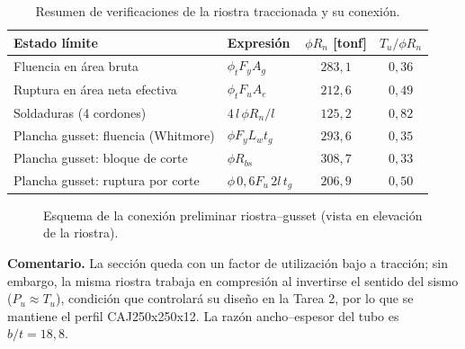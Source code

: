 \documentclass[11pt,letterpaper]{article}
\begin{document}
\begin{table}[H]
\centering
\caption{Resumen de verificaciones de la riostra traccionada y su conexión.}
\begin{tabular}{llcc}
\toprule
Estado límite & Expresión & $\phi R_n$ [tonf] & $T_u/\phi R_n$ \\
\midrule
Fluencia en área bruta & $\phi_t F_y A_g$ & $283{,}1$ & $0{,}36$ \\
Ruptura en área neta efectiva & $\phi_t F_u A_e$ & $212{,}6$ & $0{,}49$ \\
Soldaduras (4 cordones) & $4\,l\,\phi R_n/l$ & $125{,}2$ & $0{,}82$ \\
Plancha gusset: fluencia (Whitmore) & $\phi F_y L_w t_g$ & $293{,}6$ & $0{,}35$ \\
Plancha gusset: bloque de corte & $\phi R_{bs}$ & $308{,}7$ & $0{,}33$ \\
Plancha gusset: ruptura por corte & $\phi\,0{,}6F_u\,2l\,t_g$ & $206{,}9$ & $0{,}50$ \\
\bottomrule
\end{tabular}
\end{table}

\begin{figure}[H]
\centering
{}
\caption{Esquema de la conexión preliminar riostra--gusset (vista en elevación de la riostra).}
\label{fig:conexion}
\end{figure}

\textbf{Comentario.} La sección queda con un factor de utilización bajo a tracción; sin embargo, la misma riostra
trabaja en compresión al invertirse el sentido del sismo ($P_u \approx T_u$), condición que controlará su diseño
en la Tarea 2, por lo que se mantiene el perfil CAJ250x250x12. La razón ancho--espesor del tubo es
$b/t = 18{,}8$.
\end{document}
